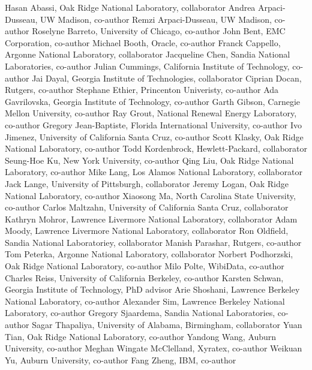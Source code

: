 Hasan Abassi, Oak Ridge National Laboratory, collaborator
Andrea Arpaci-Dusseau, UW Madison, co-author
Remzi Arpaci-Dusseau, UW Madison, co-author
Roselyne Barreto, University of Chicago, co-author
John Bent, EMC Corporation, co-author
Michael Booth, Oracle, co-author
Franck Cappello, Argonne National Laboratory, collaborator
Jacqueline Chen, Sandia National Laboratories, co-author
Julian Cummings, California Institute of Technology, co-author
Jai Dayal, Georgia Institute of Technologies, collaborator
Ciprian Docan, Rutgers, co-author
Stephane Ethier, Princenton Univeristy, co-author
Ada Gavrilovska, Georgia Institute of Technology, co-author
Garth Gibson, Carnegie Mellon University, co-author
Ray Grout, National Renewal Energy Laboratory, co-author
Gregory Jean-Baptiste, Florida International University, co-author
Ivo Jimenez, University of California Santa Cruz, co-author
Scott Klasky, Oak Ridge National Laboratory, co-author
Todd Kordenbrock, Hewlett-Packard, collaborator
Seung-Hoe Ku, New York University, co-author
Qing Liu, Oak Ridge National Laboratory, co-author
Mike Lang, Los Alamos National Laboratory, collaborator
Jack Lange, University of Pittsburgh, collaborator
Jeremy Logan, Oak Ridge National Laboratory, co-author
Xiaosong Ma, North Carolina State University, co-author
Carlos Maltzahn, University of California Santa Cruz, collaborator
Kathryn Mohror, Lawrence Livermore National Laboratory, collaborator
Adam Moody, Lawrence Livermore National Laboratory, collaborator
Ron Oldfield, Sandia National Laboratoriey, collaborator
Manish Parashar, Rutgers, co-author
Tom Peterka, Argonne National Laboratory, collaborator
Norbert Podhorzski, Oak Ridge National Laboratory, co-author
Milo Polte, WibiData, co-author
Charles Reiss, University of California Berkeley, co-author
Karsten Schwan, Georgia Institute of Technology, PhD advisor
Arie Shoshani, Lawrence Berkeley National Laboratory, co-author
Alexander Sim, Lawrence Berkeley National Laboratory, co-author
Gregory Sjaardema, Sandia National Laboratories, co-author
Sagar Thapaliya, University of Alabama, Birmingham, collaborator
Yuan Tian, Oak Ridge National Laboratory, co-author
Yandong Wang, Auburn University, co-author
Meghan Wingate McClelland, Xyratex, co-author
Weikuan Yu, Auburn University, co-author
Fang Zheng, IBM, co-author
